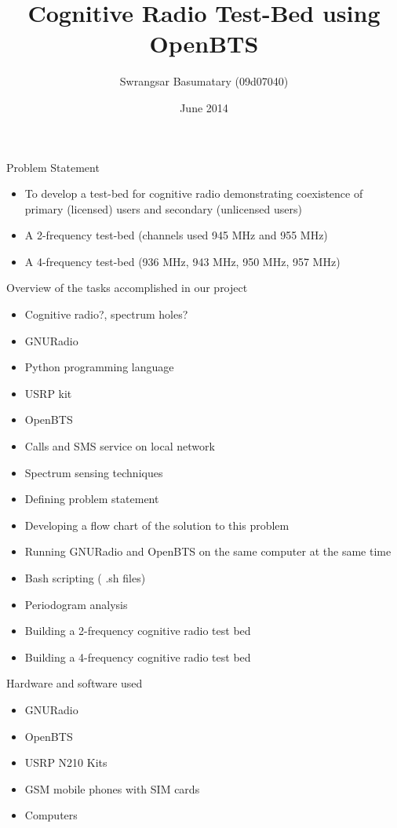 \documentclass{beamer}
\title{Cognitive Radio Test-Bed using OpenBTS}
\author{Swrangsar Basumatary (09d07040)}
\institute{Department of Electrical Engineering \\ IIT Bombay, Powai}
\date{June 2014}
\begin{document}
  \frame{\titlepage}


	\begin{frame}{Problem Statement}
    	\begin{itemize}
    		\item To develop a test-bed for cognitive radio demonstrating coexistence of primary (licensed) users and secondary (unlicensed users)
    		\item A 2-frequency test-bed (channels used 945 MHz and 955 MHz)
    		\item A 4-frequency test-bed (936 MHz, 943 MHz, 950 MHz, 957 MHz)
    	\end{itemize}
	\end{frame}
	
	\begin{frame}{Overview of the tasks accomplished in our project}
		\begin{itemize}
      \item Cognitive radio?,  spectrum holes?
      \item GNURadio
      \item Python programming language
      \item USRP kit
      \item OpenBTS
      \item Calls and SMS service on local network
      \item Spectrum sensing techniques
      \item Defining problem statement
    \end{itemize}
  \end{frame}
    
    \begin{frame}{}
        \begin{itemize}
		\item Developing a flow chart of the solution to this problem
		\item Running GNURadio and OpenBTS  on the same computer at the same time
		\item Bash scripting ( .sh files)
		\item Periodogram analysis
		\item Building a 2-frequency cognitive radio test bed
		\item Building a 4-frequency cognitive radio test bed
		\end{itemize}
	\end{frame}
	
	\begin{frame}{Hardware and software used}
    \begin{itemize}
      \item GNURadio
      \item OpenBTS
      \item USRP N210  Kits
      \item GSM mobile phones with SIM cards
      \item Computers
    \end{itemize}
  \end{frame}
\end{document}
